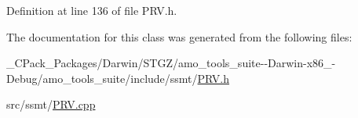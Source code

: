 Definition at line 136 of file P\+R\+V.\+h.



The documentation for this class was generated from the following files\+:\begin{DoxyCompactItemize}
\item 
\+\_\+\+C\+Pack\+\_\+\+Packages/\+Darwin/\+S\+T\+G\+Z/amo\+\_\+tools\+\_\+suite-\/-\/\+Darwin-\/x86\+\_-\/\+Debug/amo\+\_\+tools\+\_\+suite/include/ssmt/\hyperlink{___c_pack___packages_2_darwin_2_s_t_g_z_2amo__tools__suite--_darwin-x86__64-_debug_2amo__tools__suite_2include_2ssmt_2_p_r_v_8h}{P\+R\+V.\+h}\item 
src/ssmt/\hyperlink{_p_r_v_8cpp}{P\+R\+V.\+cpp}\end{DoxyCompactItemize}

